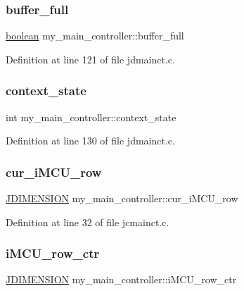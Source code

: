 \subsubsection{\texorpdfstring{buffer\_full}{buffer\_full}}
{\footnotesize\ttfamily \mbox{\hyperlink{jmorecfg_8h_a7c6368b321bd9acd0149b030bb8275ed}{boolean}} my\+\_\+main\+\_\+controller\+::buffer\+\_\+full}



Definition at line 121 of file jdmainct.\+c.

\mbox{\label{structmy__main__controller_abc90e17934b16420478e95a8875918ae}} 
\subsubsection{\texorpdfstring{context\_state}{context\_state}}
{\footnotesize\ttfamily int my\+\_\+main\+\_\+controller\+::context\+\_\+state}



Definition at line 130 of file jdmainct.\+c.

\mbox{\label{structmy__main__controller_a1c6081c98910d41e03fa33763a832a6f}} 
\subsubsection{\texorpdfstring{cur\_iMCU\_row}{cur\_iMCU\_row}}
{\footnotesize\ttfamily \mbox{\hyperlink{jmorecfg_8h_a04ed4674f6f1d0d50ec241531e38274f}{J\+D\+I\+M\+E\+N\+S\+I\+ON}} my\+\_\+main\+\_\+controller\+::cur\+\_\+i\+M\+C\+U\+\_\+row}



Definition at line 32 of file jcmainct.\+c.

\mbox{\label{structmy__main__controller_a01c8f176e423a5d8e37637fa8210b236}} 
\subsubsection{\texorpdfstring{iMCU\_row\_ctr}{iMCU\_row\_ctr}}
{\footnotesize\ttfamily \mbox{\hyperlink{jmorecfg_8h_a04ed4674f6f1d0d50ec241531e38274f}{J\+D\+I\+M\+E\+N\+S\+I\+ON}} my\+\_\+main\+\_\+controller\+::i\+M\+C\+U\+\_\+row\+\_\+ctr}



